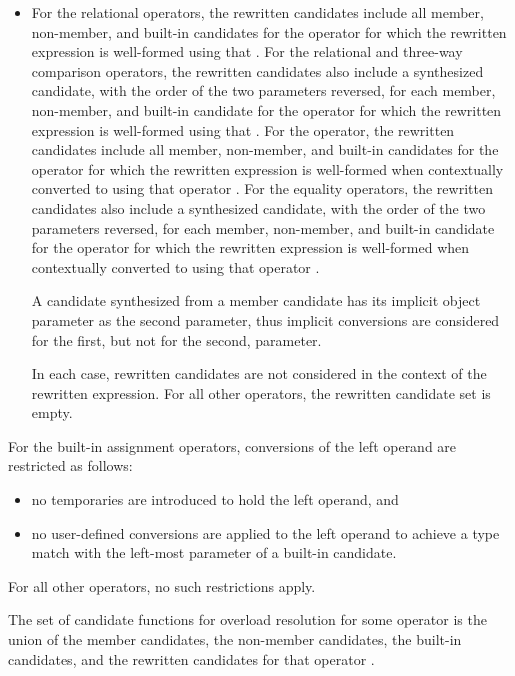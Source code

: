 \begin{itemize}
\item
For the relational operators,
the rewritten candidates include
all member, non-member, and built-in candidates
for the operator \tcode{<=>}
for which the rewritten expression
 is well-formed using that .
For the
relational and
three-way comparison
operators,
the rewritten candidates also include
a synthesized candidate,
with the order of the two parameters reversed,
for each member, non-member, and built-in candidate
for the operator \tcode{<=>}
for which the rewritten expression
 is well-formed using that .
For the \tcode{!=} operator,
the rewritten candidates
include all member, non-member, and built-in candidates
for the operator \tcode{==}
for which the rewritten expression  is well-formed
when contextually converted to  using that operator \tcode{==}.
For the equality operators,
the rewritten candidates also include a synthesized candidate,
with the order of the two parameters reversed,
for each member, non-member, and built-in candidate for the operator \tcode{==}
for which the rewritten expression  is well-formed
when contextually converted to  using that operator \tcode{==}.
\begin{note}
A candidate synthesized from a member candidate has its implicit
object parameter as the second parameter, thus implicit conversions
are considered for the first, but not for the second, parameter.
\end{note}
In each case, rewritten candidates are not considered
in the context of the rewritten expression.
For all other operators, the rewritten candidate set is empty.
\end{itemize}

\pnum
For the built-in assignment operators, conversions of the left
operand are restricted as follows:

\begin{itemize}
\item
no temporaries are introduced to hold the left operand, and
\item
no user-defined conversions are applied to the left operand to achieve
a type match with the left-most parameter of a built-in candidate.
\end{itemize}

\pnum
For all other operators, no such restrictions apply.

\pnum
The set of candidate functions for overload resolution
for some operator 
is the
union of
the member candidates,
the non-member candidates,
the built-in candidates,
and the rewritten candidates
for that operator .

